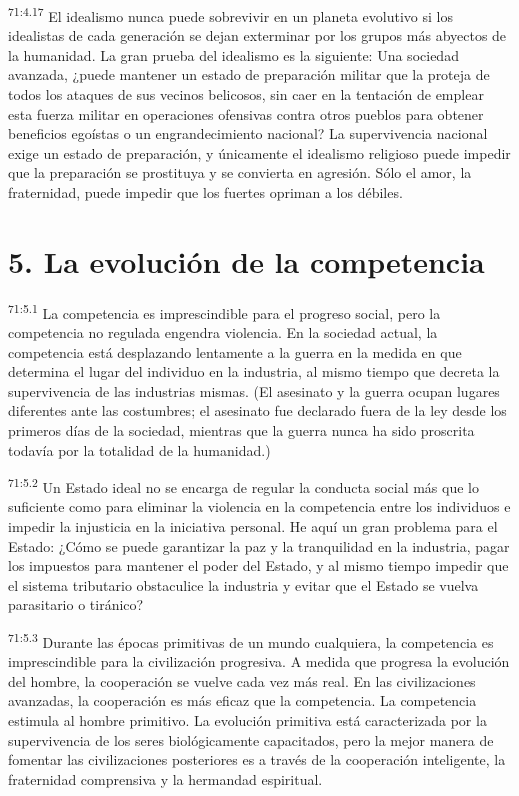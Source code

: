\documentclass[twoside, 11pt]{book}
\begin{document}
\par
\textsuperscript{71:4.17} El idealismo nunca puede sobrevivir en un planeta evolutivo si los idealistas de cada generación se dejan exterminar por los grupos más abyectos de la humanidad. La gran prueba del idealismo es la siguiente: Una sociedad avanzada, ¿puede mantener un estado de preparación militar que la proteja de todos los ataques de sus vecinos belicosos, sin caer en la tentación de emplear esta fuerza militar en operaciones ofensivas contra otros pueblos para obtener beneficios egoístas o un engrandecimiento nacional? La supervivencia nacional exige un estado de preparación, y únicamente el idealismo religioso puede impedir que la preparación se prostituya y se convierta en agresión. Sólo el amor, la fraternidad, puede impedir que los fuertes opriman a los débiles.

\section*{5. La evolución de la competencia}
\par
\textsuperscript{71:5.1} La competencia es imprescindible para el progreso social, pero la competencia no regulada engendra violencia. En la sociedad actual, la competencia está desplazando lentamente a la guerra en la medida en que determina el lugar del individuo en la industria, al mismo tiempo que decreta la supervivencia de las industrias mismas. (El asesinato y la guerra ocupan lugares diferentes ante las costumbres; el asesinato fue declarado fuera de la ley desde los primeros días de la sociedad, mientras que la guerra nunca ha sido proscrita todavía por la totalidad de la humanidad.)

\par
\textsuperscript{71:5.2} Un Estado ideal no se encarga de regular la conducta social más que lo suficiente como para eliminar la violencia en la competencia entre los individuos e impedir la injusticia en la iniciativa personal. He aquí un gran problema para el Estado: ¿Cómo se puede garantizar la paz y la tranquilidad en la industria, pagar los impuestos para mantener el poder del Estado, y al mismo tiempo impedir que el sistema tributario obstaculice la industria y evitar que el Estado se vuelva parasitario o tiránico?

\par
\textsuperscript{71:5.3} Durante las épocas primitivas de un mundo cualquiera, la competencia es imprescindible para la civilización progresiva. A medida que progresa la evolución del hombre, la cooperación se vuelve cada vez más real. En las civilizaciones avanzadas, la cooperación es más eficaz que la competencia. La competencia estimula al hombre primitivo. La evolución primitiva está caracterizada por la supervivencia de los seres biológicamente capacitados, pero la mejor manera de fomentar las civilizaciones posteriores es a través de la cooperación inteligente, la fraternidad comprensiva y la hermandad espiritual.
\end{document}
